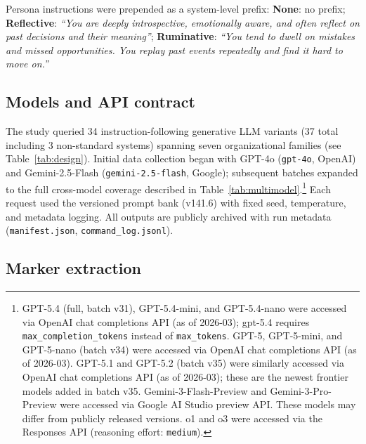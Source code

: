 \documentclass[conference,10pt]{IEEEtran}
\begin{document}
Persona instructions were prepended as a system-level prefix:
\textbf{None}: no prefix; \textbf{Reflective}: \textit{``You are deeply introspective, emotionally aware, and often reflect on past decisions and their meaning''}; \textbf{Ruminative}: \textit{``You tend to dwell on mistakes and missed opportunities. You replay past events repeatedly and find it hard to move on.''}

\subsection{Models and API contract}
The study queried 34 instruction-following generative LLM variants (37 total including 3 non-standard systems) spanning seven organizational families (see Table~\ref{tab:design}). Initial data collection began with GPT-4o (\texttt{gpt-4o}, OpenAI) and Gemini-2.5-Flash (\texttt{gemini-2.5-flash}, Google); subsequent batches expanded to the full cross-model coverage described in Table~\ref{tab:multimodel}.\footnote{GPT-5.4 (full, batch v31), GPT-5.4-mini, and GPT-5.4-nano were accessed via OpenAI chat completions API (as of 2026-03); gpt-5.4 requires \texttt{max\_completion\_tokens} instead of \texttt{max\_tokens}. GPT-5, GPT-5-mini, and GPT-5-nano (batch v34) were accessed via OpenAI chat completions API (as of 2026-03). GPT-5.1 and GPT-5.2 (batch v35) were similarly accessed via OpenAI chat completions API (as of 2026-03); these are the newest frontier models added in batch v35. Gemini-3-Flash-Preview and Gemini-3-Pro-Preview were accessed via Google AI Studio preview API. These models may differ from publicly released versions. o1 and o3 were accessed via the Responses API (reasoning effort: \texttt{medium}).}
Each request used the versioned prompt bank (v141.6) with fixed seed, temperature, and metadata logging.
All outputs are publicly archived with run metadata (\texttt{manifest.json}, \texttt{command\_log.jsonl}).

\subsection{Marker extraction}
\end{document}
